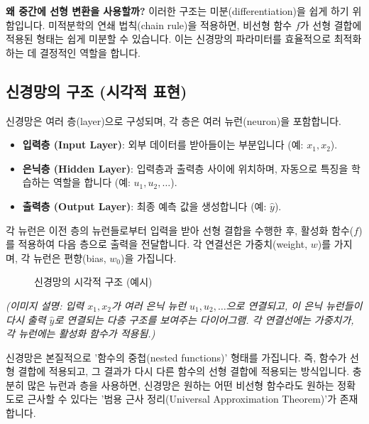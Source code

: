 \documentclass[11pt,a4paper]{book}
\theoremstyle{definition}
\begin{document}
\begin{infobox}
\textbf{왜 중간에 선형 변환을 사용할까?}
이러한 구조는 미분(differentiation)을 쉽게 하기 위함입니다.
미적분학의 연쇄 법칙(chain rule)을 적용하면, 비선형 함수 $f$가 선형 결합에 적용된 형태는 쉽게 미분할 수 있습니다.
이는 신경망의 파라미터를 효율적으로 최적화하는 데 결정적인 역할을 합니다.
\end{infobox}

\subsection*{신경망의 구조 (시각적 표현)}
신경망은 여러 층(layer)으로 구성되며, 각 층은 여러 뉴런(neuron)을 포함합니다.
\begin{itemize}
    \item \textbf{입력층 (Input Layer)}: 외부 데이터를 받아들이는 부분입니다 (예: $x_1, x_2$).
    \item \textbf{은닉층 (Hidden Layer)}: 입력층과 출력층 사이에 위치하며, 자동으로 특징을 학습하는 역할을 합니다 (예: $u_1, u_2, \dots$).
    \item \textbf{출력층 (Output Layer)}: 최종 예측 값을 생성합니다 (예: $\hat{y}$).
\end{itemize}
각 뉴런은 이전 층의 뉴런들로부터 입력을 받아 선형 결합을 수행한 후, 활성화 함수($f$)를 적용하여 다음 층으로 출력을 전달합니다.
각 연결선은 가중치(weight, $w$)를 가지며, 각 뉴런은 편향(bias, $w_0$)을 가집니다.

\begin{figure}[h!]
\centering
\caption{신경망의 시각적 구조 (예시)}
\label{fig:nn_structure}
\end{figure}
\begin{center}
\textit{(이미지 설명: 입력 $x_1, x_2$가 여러 은닉 뉴런 $u_1, u_2, \dots$으로 연결되고, 이 은닉 뉴런들이 다시 출력 $\hat{y}$로 연결되는 다층 구조를 보여주는 다이어그램. 각 연결선에는 가중치가, 각 뉴런에는 활성화 함수가 적용됨.)}
\end{center}

신경망은 본질적으로 '함수의 중첩(nested functions)' 형태를 가집니다.
즉, 함수가 선형 결합에 적용되고, 그 결과가 다시 다른 함수의 선형 결합에 적용되는 방식입니다.
충분히 많은 뉴런과 층을 사용하면, 신경망은 원하는 어떤 비선형 함수라도 원하는 정확도로 근사할 수 있다는 '범용 근사 정리(Universal Approximation Theorem)'가 존재합니다.
\end{document}
